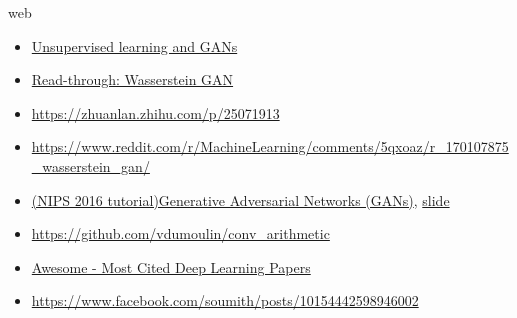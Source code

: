 \documentclass[9pt]{beamer}
\begin{document}
\begin{frame}{web}
  \begin{itemize}
  \item
    \href{https://blog.acolyer.org/2017/03/02/unsupervised-learning-and-gans/}{Unsupervised
      learning and GANs}
  \item
    \href{http://www.alexirpan.com/2017/02/22/wasserstein-gan.html}{Read-through:
      Wasserstein GAN}
  \item \url{https://zhuanlan.zhihu.com/p/25071913}
  \item
    \url{https://www.reddit.com/r/MachineLearning/comments/5qxoaz/r_170107875_wasserstein_gan/}
  \item \href{https://arxiv.org/abs/1701.00160}{(NIPS 2016
    tutorial)Generative Adversarial Networks (GANs)},
    \href{http://www.iangoodfellow.com/slides/2016-12-04-NIPS.pdf
    }{slide}
  \item \url{https://github.com/vdumoulin/conv_arithmetic}
  \item
    \href{https://github.com/terryum/awesome-deep-learning-papers}{Awesome
      - Most Cited Deep Learning Papers}
  \item \url{https://www.facebook.com/soumith/posts/10154442598946002}
  \end{itemize}
\end{frame}
\end{document}
